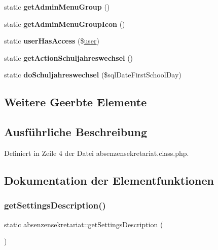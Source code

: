 \begin{DoxyCompactItemize}
static {\bfseries get\+Admin\+Menu\+Group} ()
\item 
\mbox{\label{classabsenzensekretariat_a083a33655e01edc965b7212d900dd5a2}} 
static {\bfseries get\+Admin\+Menu\+Group\+Icon} ()
\item 
\mbox{\label{classabsenzensekretariat_a345340b9fc983b40520c9bd1fbb9c53a}} 
static {\bfseries user\+Has\+Access} (\$\mbox{\hyperlink{classuser}{user}})
\item 
\mbox{\label{classabsenzensekretariat_aef73b435913d333c4c082474482a3565}} 
static {\bfseries get\+Action\+Schuljahreswechsel} ()
\item 
\mbox{\label{classabsenzensekretariat_a63dcc70fbe33cda4112fd6ff4475341f}} 
static {\bfseries do\+Schuljahreswechsel} (\$sql\+Date\+First\+School\+Day)
\end{DoxyCompactItemize}
\subsection*{Weitere Geerbte Elemente}


\subsection{Ausführliche Beschreibung}


Definiert in Zeile 4 der Datei absenzensekretariat.\+class.\+php.



\subsection{Dokumentation der Elementfunktionen}
\mbox{\label{classabsenzensekretariat_a817c3ee9f0393a06973a6c8fe5f01a01}} 
\subsubsection{\texorpdfstring{get\+Settings\+Description()}{getSettingsDescription()}}
{\footnotesize\ttfamily static absenzensekretariat\+::get\+Settings\+Description (\begin{DoxyParamCaption}{ }\end{DoxyParamCaption})\hspace{0.3cm}{\ttfamily [static]}}

